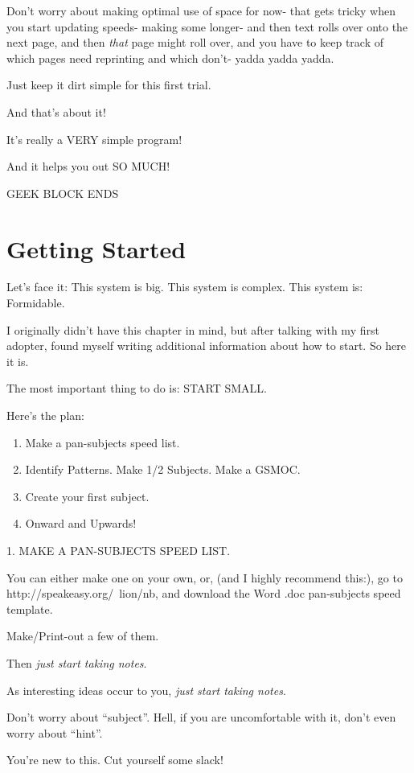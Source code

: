 \documentclass[oneside]{book}
\begin{document}
Don't worry about making optimal use of space for now- that gets
tricky when you start updating speeds- making some longer- and then
text rolls over onto the next page, and then \emph{that} page might roll
over, and you have to keep track of which pages need reprinting and
which don't- yadda yadda yadda.

Just keep it dirt simple for this first trial.


And that's about it!

It's really a VERY simple program!

And it helps you out SO MUCH!

GEEK BLOCK ENDS


\chapter{Getting Started}
Let's face it: This system is big. This system is complex. This system
is: Formidable.

I originally didn't have this chapter in mind, but after talking with
my first adopter, found myself writing additional information about
how to start. So here it is.

The most important thing to do is:
START SMALL.

Here's the plan:

\begin{enumerate}
\item Make a pan-subjects speed list.
\item Identify Patterns. Make 1/2 Subjects. Make a GSMOC.
\item Create your first subject.
\item Onward and Upwards!
\end{enumerate}

1. MAKE A PAN-SUBJECTS SPEED LIST.

You can either make one on your own, or, (and I highly recommend
this:), go to http://speakeasy.org/~lion/nb, and download the Word
.doc pan-subjects speed template.

Make/Print-out a few of them.

Then \emph{just start taking notes}.

As interesting ideas occur to you, \emph{just start taking notes}.

Don't worry about ``subject''. Hell, if you are uncomfortable with it,
don't even worry about ``hint''.

You're new to this. Cut yourself some slack!
\end{document}
